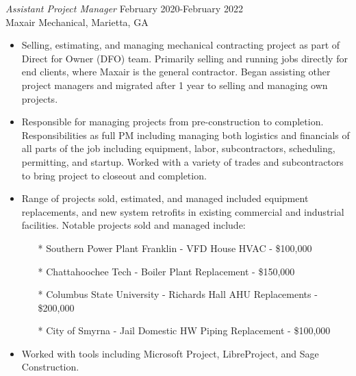 \documentclass[margin]{res}
\begin{document}
\begin{resume}
    {\sl Assistant Project Manager} \hfill February 2020-February 2022 \\
 	    Maxair Mechanical, Marietta, GA
        \begin{itemize}  \itemsep -2pt %
            \item Selling, estimating, and managing mechanical contracting project as part of Direct for Owner (DFO) team. Primarily selling and running jobs directly for end clients, where Maxair is the general contractor. Began assisting other project managers and migrated after 1 year to selling and managing own projects.
             \item Responsible for managing projects from pre-construction to completion. Responsibilities as full PM including managing both logistics and financials of all parts of the job including equipment, labor, subcontractors, scheduling, permitting, and startup. Worked with a variety of trades and subcontractors to bring project to closeout and completion.
            \item Range of projects sold, estimated, and managed included equipment replacements, and new system retrofits in existing commercial and industrial facilities. Notable projects sold and managed include:
              \begin{itemize}
                \item[*] Southern Power Plant Franklin - VFD House HVAC - \$100,000
                \item[*] Chattahoochee Tech - Boiler Plant Replacement - \$150,000
                \item[*] Columbus State University - Richards Hall AHU Replacements - \$200,000
                \item[*] City of Smyrna - Jail Domestic HW Piping Replacement - \$100,000
              \end{itemize}
            \item Worked with tools including Microsoft Project, LibreProject, and Sage Construction.
            \end{itemize}


\end{resume}
\end{document}
